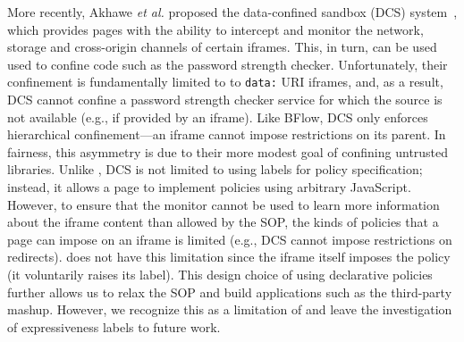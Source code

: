 More recently, Akhawe \emph{et al.} proposed the data-confined
sandbox (DCS) system~\cite{Akhawe2013}, which provides pages with the
ability to intercept and monitor the network, storage and cross-origin
channels of certain iframes.
%
This, in turn, can be used used to confine code such as the password
strength checker.
%
Unfortunately, their confinement is fundamentally limited to to
\verb|data:| URI iframes, and, as a result, DCS cannot confine a
password strength checker service for which the source is not
available (e.g., if provided by an iframe).
%
Like BFlow, DCS only enforces hierarchical confinement---an iframe
cannot impose restrictions on its parent.
%
In fairness, this asymmetry is due to their more modest goal of
confining untrusted libraries.
%
Unlike \sys{}, DCS is not limited to using labels for policy
specification; instead, it allows a page to implement policies using
arbitrary JavaScript.
%
However, to ensure that the monitor cannot be used to learn more
information about the iframe content than allowed by the SOP, the
kinds of policies that a page can impose on an iframe is limited
(e.g., DCS cannot impose restrictions on redirects).
%
\sys{} does not have this limitation since the iframe itself imposes
the policy (it voluntarily raises its label).
%
This design choice of using declarative policies further allows us to
relax the SOP and build applications such as the third-party mashup.
%
 However, we recognize this as a limitation of \sys{} and leave the
investigation of expressiveness labels to future work.




